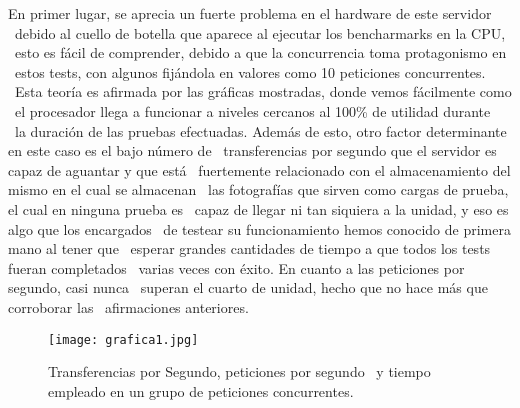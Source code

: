 \documentclass[11pt,twoside,a4paper]{book}
\begin{document}
En primer lugar, se aprecia un fuerte problema en el hardware de este servidor \
debido al cuello de botella que aparece al ejecutar los bencharmarks en la CPU, \
esto es fácil de comprender, debido a que la concurrencia toma protagonismo en \
estos tests, con algunos fijándola en valores como 10 peticiones concurrentes. \
Esta teoría es afirmada por las gráficas mostradas, donde vemos fácilmente como \
el procesador llega a funcionar a niveles cercanos al 100\% de utilidad durante \
la duración de las pruebas efectuadas.\newline \newline
\indent Además de esto, otro factor determinante en este caso es el bajo número de \
transferencias por segundo que el servidor es capaz de aguantar y que está \
fuertemente relacionado con el almacenamiento del mismo en el cual se almacenan \
las fotografías que sirven como cargas de prueba, el cual en ninguna prueba es \
capaz de llegar ni tan siquiera a la unidad, y eso es algo que los encargados \
de testear su funcionamiento hemos conocido de primera mano al tener que \
esperar grandes cantidades de tiempo a que todos los tests fueran completados \
varias veces con éxito. En cuanto a las peticiones por segundo, casi nunca \
superan el cuarto de unidad, hecho que no hace más que corroborar las \
afirmaciones anteriores. \newline

\begin{figure}[H]
   \texttt{[image: grafica1.jpg]}
   \caption{Transferencias por Segundo, peticiones por segundo \
   y tiempo empleado en un grupo de peticiones concurrentes.}
   \label{Fig1}
\end{figure}
\end{document}
